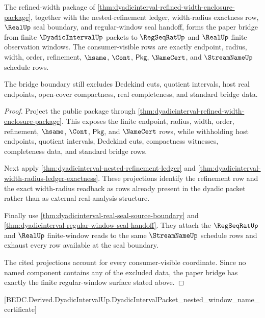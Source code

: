 \begin{theorem}
\label{thm:dyadicinterval-regular-window-bridge-boundary}
The refined-width package of
\autoref{thm:dyadicinterval-refined-width-enclosure-package}, together with the
nested-refinement ledger, width-radius exactness row, $\RealUp$ seal boundary,
and regular-window seal handoff, forms the paper bridge from finite
$\DyadicIntervalUp$ packets to $\RegSeqRatUp$ and $\RealUp$ finite observation
windows. The consumer-visible rows are exactly endpoint, radius, width, order,
refinement, $\hsame$, $\Cont$, $\mathsf{Pkg}$, $\NameCert$, and
$\StreamNameUp$ schedule rows.

The bridge boundary still excludes Dedekind cuts, quotient intervals, host real
endpoints, open-cover compactness, real completeness, and standard bridge data.
\end{theorem}
\begin{proof}
Project the public package through
\autoref{thm:dyadicinterval-refined-width-enclosure-package}. This exposes the
finite endpoint, radius, width, order, refinement, $\hsame$, $\Cont$,
$\mathsf{Pkg}$, and $\NameCert$ rows, while withholding host endpoints,
quotient intervals, Dedekind cuts, compactness witnesses, completeness data, and
standard bridge rows.

Next apply \autoref{thm:dyadicinterval-nested-refinement-ledger} and
\autoref{thm:dyadicinterval-width-radius-ledger-exactness}. These projections
identify the refinement row and the exact width-radius readback as rows already
present in the dyadic packet rather than as external real-analysis structure.

Finally use \autoref{thm:dyadicinterval-real-seal-source-boundary} and
\autoref{thm:dyadicinterval-regular-window-seal-handoff}. They attach the
$\RegSeqRatUp$ and $\RealUp$ finite-window reads to the same
$\StreamNameUp$ schedule rows and exhaust every row available at the seal
boundary.

The cited projections account for every consumer-visible coordinate. Since no
named component contains any of the excluded data, the paper bridge has exactly
the finite regular-window surface stated above.
\end{proof}

[BEDC.Derived.DyadicIntervalUp.DyadicIntervalPacket\_nested\_window\_name\_certificate]

